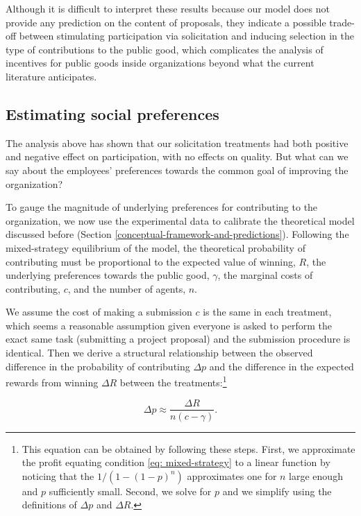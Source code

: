 \documentclass[11pt]{article}
\begin{document}
Although it is difficult to interpret these results because our model
does not provide any prediction on the content of proposals, they
indicate a possible trade-off between stimulating participation via
solicitation and inducing selection in the type of contributions to the
public good, which complicates the analysis of incentives for public
goods inside organizations beyond what the current literature
anticipates.

\subsection{Estimating social
preferences}\label{estimating-social-preferences}

The analysis above has shown that our solicitation treatments had both
positive and negative effect on participation, with no effects on
quality. But what can we say about the employees' preferences towards
the common goal of improving the organization?

To gauge the magnitude of underlying preferences for contributing to the
organization, we now use the experimental data to calibrate the
theoretical model discussed before (Section
\ref{conceptual-framework-and-predictions}). Following the
mixed-strategy equilibrium of the model, the theoretical probability of
contributing must be proportional to the expected value of winning,
\(R\), the underlying preferences towards the public good, \(\gamma\),
the marginal costs of contributing, \(c\), and the number of agents,
\(n\).

We assume the cost of making a submission \(c\) is the same in each
treatment, which seems a reasonable assumption given everyone is asked
to perform the exact same task (submitting a project proposal) and the
submission procedure is identical. Then we derive a structural
relationship between the observed difference in the probability of
contributing \(\Delta p\) and the difference in the expected rewards
from winning \(\Delta R\) between the treatments:\footnote{This equation
  can be obtained by following these steps. First, we approximate the
  profit equating condition \eqref{eq: mixed-strategy} to a linear
  function by noticing that the \(1/(1-(1-p)^n)\) approximates one for
  \(n\) large enough and \(p\) sufficiently small. Second, we solve for
  \(p\) and we simplify using the definitions of \(\Delta p\) and
  \(\Delta R\).}

\begin{equation}
  \label{eq: delta}
  \Delta p \approx\frac{\Delta R}{n (c - \gamma)}.
\end{equation}
\end{document}
